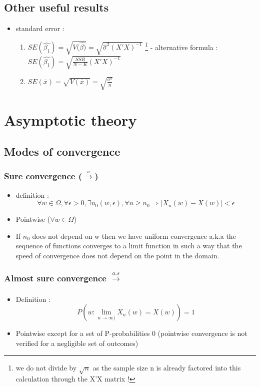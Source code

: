 \documentclass{article}
\begin{document}
\subsection{Other useful results}
\begin{itemize}
    \item standard error : 
    \begin{enumerate}
        \item $SE(\hat{\beta_1}) = \sqrt{V(\hat{\beta)}} = \sqrt{\hat{\sigma}^2(X'X)^{-1}}$ \footnote{we do not divide by $\sqrt{n}$ as the sample size n is already factored into this calculation through the X'X matrix !} 
            \subitem - alternative formula : $SE(\hat{\beta_1})=\sqrt{\frac{SSR}{N-K}(X'X)^{-1}}$
        \item $SE(\bar{x}) = \sqrt{V(\bar{x})} = \sqrt{\frac{\sigma^2}{n}}$ 
    \end{enumerate}
\end{itemize}


\section{Asymptotic theory}
\subsection{Modes of convergence}
\subsubsection{Sure convergence ($\xrightarrow{s}$)}
\begin{itemize}
    \item definition : 
\begin{equation}
    \forall w\in\Omega, \forall\epsilon>0,\exists n_0(w,\epsilon),\forall n\geq n_0\Longrightarrow|X_n(w)-X(w)|<\epsilon
\end{equation}
    \item Pointwise ($\forall w\in\Omega$)
    \item If $n_0$ does not depend on w then we have uniform convergence a.k.a the sequence of functions converges to a limit function in such a way that the speed of convergence does not depend on the point in the domain.
\end{itemize}

\subsubsection{Almost sure convergence $\xrightarrow[]{a.s}$}
\begin{itemize}
    \item Definition :
    \begin{equation}
        P(w:\lim_{n\to\infty)}X_n(w)=X(w))=1
    \end{equation}
    \item Pointwise except for a set of P-probabilities 0 (pointwise convergence is not verified for a negligible set of outcomes)
\end{itemize}
\end{document}
